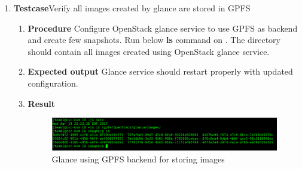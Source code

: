 \begin{enumerate}
\item \textbf{Testcase}\newline Verify all images created by glance are stored in GPFS
  \begin{enumerate}[label={}]
  \item \textbf{Procedure}\newline
    Configure OpenStack glance service to use GPFS as backend and
    create few snapshots. Run below \textbf{ls} command on
    .
    The directory should contain all images created using OpenStack
    glance service.
  \item \textbf{Expected output}\newline
    Glance service should restart properly with updated configuration.
  \item \textbf{Result}\newline
    \begin{figure}
      \centering
      \includegraphics[scale=0.4]{screenshots/gpfs-storage.png}
      \caption{Glance using GPFS backend for storing images}
      \label{gpfs-storage}
    \end{figure}
  \end{enumerate}

\end{enumerate}


